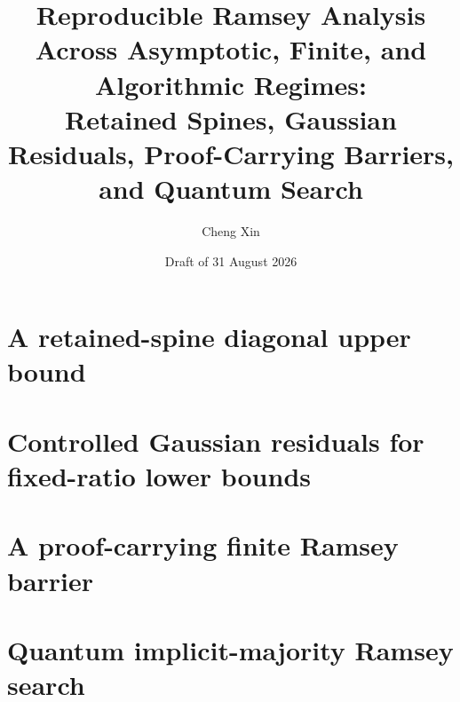 \documentclass[11pt,reqno]{amsart}
\title[Four reproducible Ramsey results]{Reproducible Ramsey Analysis Across Asymptotic, Finite, and Algorithmic Regimes:\\
Retained Spines, Gaussian Residuals, Proof-Carrying Barriers, and Quantum Search}
\author{Cheng Xin}
\date{Draft of 31 August 2026}
\theoremstyle{definition}
\theoremstyle{remark}
\begin{document}
\begin{abstract}

\end{abstract}

\maketitle
{}
\tableofcontents




\part{A retained-spine diagonal upper bound}








\part{Controlled Gaussian residuals for fixed-ratio lower bounds}









\part{A proof-carrying finite Ramsey barrier}









\part{Quantum implicit-majority Ramsey search}







\end{document}
